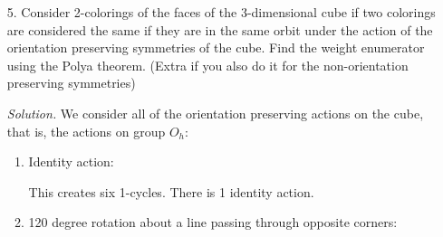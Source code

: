 \documentclass[11pt,letterpaper]{article}
\newenvironment{solution}{\color{black}\textit{Solution.}}{\color{gray}}
\begin{document}
\begin{enumerate}
\begin{solution}
        If $n$ is odd, a reflection creates $\frac{(n-1)}{2}$ 2-cycles, and one 1-cycle (the point being passed through by the line of symmetry). If $n$ is even, half of our reflection lines pass through 0 points, and the other half pass through 2 points. Thus, half of our symmetries have $\frac{n}{2}$ 2-cycles, and the other half has $\frac{(n-2)}{2}$ 2-cycles and two 1-cycles.  Thus, our cycle index for $D_n$ is 
        \[
            {\displaystyle Z(D_{n})={\frac {1}{2}}Z(C_{n})+{\begin{cases}
                {\frac {1}{2}}z_{1}z_{2}^{\frac{(n-1)}{2}}
                &n \mbox{ is odd}\\
                {\frac {1}{4}}\left(z_{1}^{2}z_{2}^{\frac{(n-2)}{2}}+z_{2}^{\frac{n}{2}}\right)
                &n{\mbox{ is even.}}
            \end{cases}}}
        \]
        When plugging in 2 for all $z_k$, we note that $Z(C_n)$ will collapse to the number of bracelets under $C_n$ with 2 colors. Thus, using the bracelet formula from class, we get that the number of total bracelets under $D_n$ is
        \[
            {\frac {1}{2n}}\sum _{d|n}\varphi (d)2^{n/d}
            +{\begin{cases}
                2^{\frac{(n-1)}{2}}
                &n \mbox{ is odd}\\
                2^{\frac{(n-2)}{2}}+2^{\frac{(n-4)}{2}}
                &n{\mbox{ is even.}}
            \end{cases}}
        \]
    \end{solution}
    
    \item[5.] Consider 2-colorings of the faces of the 3-dimensional cube if two colorings are considered the same if they are in the same orbit under the action of the orientation preserving symmetries of the cube.  Find the weight enumerator using the Polya theorem.  (Extra if you also do it for the non-orientation preserving symmetries)
    
    \begin{solution}
        We consider all of the orientation preserving actions on the cube, that is, the actions on group $O_h$:
        \begin{enumerate}
            \item Identity action:
            
            This creates six 1-cycles. There is 1 identity action.
            \item 120 degree rotation about a line passing through opposite corners:
            

\end{enumerate}
\end{solution}
\end{enumerate}
\end{document}
